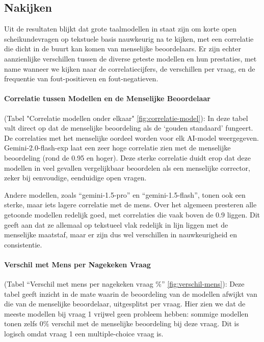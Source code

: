 \documentclass[12pt]{article}
\begin{document}
\subsection{Nakijken}
\begin{multicols}{2}
Uit de resultaten blijkt dat grote taalmodellen in staat zijn om korte open scheikundevragen op tekstuele basis nauwkeurig na te kijken, met een correlatie die dicht in de buurt kan komen van menselijke beoordelaars. Er zijn echter aanzienlijke verschillen tussen de diverse geteste modellen en hun prestaties, met name wanneer we kijken naar de correlatiecijfers, de verschillen per vraag, en de frequentie van fout-positieven en fout-negatieven.

\paragraph*{Correlatie tussen Modellen en de Menselijke Beoordelaar} (Tabel "Correlatie modellen onder elkaar" \ref{fig:correlatie-model}):
In deze tabel valt direct op dat de menselijke beoordeling als de ‘gouden standaard’ fungeert. De correlaties met het menselijke oordeel worden voor elk AI-model weergegeven. Gemini-2.0-flash-exp laat een zeer hoge correlatie zien met de menselijke beoordeling (rond de 0.95 en hoger). Deze sterke correlatie duidt erop dat deze modellen in veel gevallen vergelijkbaar beoordelen als een menselijke corrector, zeker bij eenvoudige, eenduidige open vragen.

Andere modellen, zoals “gemini-1.5-pro” en “gemini-1.5-flash”, tonen ook een sterke, maar iets lagere correlatie met de mens. Over het algemeen presteren alle getoonde modellen redelijk goed, met correlaties die vaak boven de 0.9 liggen. Dit geeft aan dat ze allemaal op tekstueel vlak redelijk in lijn liggen met de menselijke maatstaf, maar er zijn dus wel verschillen in nauwkeurigheid en consistentie.

\paragraph*{Verschil met Mens per Nagekeken Vraag} (Tabel “Verschil met mens per nagekeken vraag \%” \ref{fig:verschil-mens}):
Deze tabel geeft inzicht in de mate waarin de beoordeling van de modellen afwijkt van die van de menselijke beoordelaar, uitgesplitst per vraag. Hier zien we dat de meeste modellen bij vraag 1 vrijwel geen probleem hebben: sommige modellen tonen zelfs 0\% verschil met de menselijke beoordeling bij deze vraag. Dit is logisch omdat vraag 1 een multiple-choice vraag is.


\end{multicols}
\end{document}
